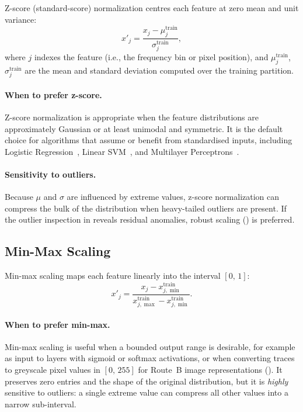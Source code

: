 Z-score (standard-score) normalization centres each feature at zero mean
and unit variance:
\begin{equation}
  x'_j = \frac{x_j - \mu_j^{\text{train}}}
               {\sigma_j^{\text{train}}},
  \label{eq:zscore}
\end{equation}
where $j$ indexes the feature (i.e., the frequency bin or pixel
position), and $\mu_j^{\text{train}}$, $\sigma_j^{\text{train}}$ are
the mean and standard deviation computed over the training partition.

\paragraph{When to prefer z-score.}
Z-score normalization is appropriate when the feature distributions are
approximately Gaussian or at least unimodal and symmetric.  It is the
default choice for algorithms that assume or benefit from standardised
inputs, including Logistic Regression~\cite{hosmer2013logistic},
Linear SVM~\cite{vapnik1995svm,cortes1995svm}, and Multilayer
Perceptrons~\cite{haykin2009nn,goodfellow2016deep}.

\paragraph{Sensitivity to outliers.}
Because $\mu$ and $\sigma$ are influenced by extreme values, z-score
normalization can compress the bulk of the distribution when heavy-tailed
outliers are present.  If the outlier inspection in 
reveals residual anomalies, robust scaling () is
preferred.

\subsection{Min-Max Scaling}
\label{sec:norm:minmax}

Min-max scaling maps each feature linearly into the interval $[0,\,1]$:
\begin{equation}
  x'_j = \frac{x_j - x_{j,\min}^{\text{train}}}
               {x_{j,\max}^{\text{train}} - x_{j,\min}^{\text{train}}}.
  \label{eq:minmax}
\end{equation}

\paragraph{When to prefer min-max.}
Min-max scaling is useful when a bounded output range is desirable, for
example as input to layers with sigmoid or softmax activations, or when
converting traces to greyscale pixel values in $[0,\,255]$ for
Route~B image representations ().  It preserves zero
entries and the shape of the original distribution, but it is
\emph{highly} sensitive to outliers: a single extreme value can compress
all other values into a narrow sub-interval.

